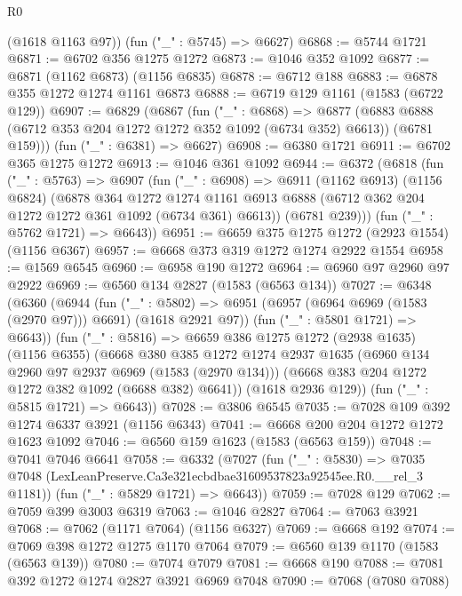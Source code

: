 \begin{lexlean}{R0}
\begin{coremodule}
      (@1618 @1163 @97))
    (fun ("_" : @5745) => @6627)
@6868 := @5744 @1721
@6871 := @6702 @356 @1275 @1272
@6873 := @1046 @352 @1092
@6877 := @6871 (@1162 @6873) (@1156 @6835)
@6878 := @6712 @188
@6883 := @6878 @355 @1272 @1274 @1161 @6873
@6888 := @6719 @129 @1161 (@1583 (@6722 @129))
@6907 := @6829
    (@6867
      (fun ("_" : @6868) =>
      @6877 (@6883 @6888 (@6712 @353 @204 @1272 @1272 @352 @1092 (@6734 @352) @6613)) (@6781 @159)))
    (fun ("_" : @6381) => @6627)
@6908 := @6380 @1721
@6911 := @6702 @365 @1275 @1272
@6913 := @1046 @361 @1092
@6944 := @6372
    (@6818
      (fun ("_" : @5763) =>
      @6907
        (fun ("_" : @6908) =>
        @6911
          (@1162 @6913)
          (@1156 @6824)
          (@6878
            @364
            @1272
            @1274
            @1161
            @6913
            @6888
            (@6712 @362 @204 @1272 @1272 @361 @1092 (@6734 @361) @6613))
          (@6781 @239)))
      (fun ("_" : @5762 @1721) => @6643))
@6951 := @6659 @375 @1275 @1272 (@2923 @1554) (@1156 @6367)
@6957 := @6668 @373 @319 @1272 @1274 @2922 @1554
@6958 := @1569 @6545
@6960 := @6958 @190 @1272
@6964 := @6960 @97 @2960 @97 @2922
@6969 := @6560 @134 @2827 (@1583 (@6563 @134))
@7027 := @6348
    (@6360
      (@6944
        (fun ("_" : @5802) =>
        @6951 (@6957 (@6964 @6969 (@1583 (@2970 @97))) @6691) (@1618 @2921 @97))
        (fun ("_" : @5801 @1721) => @6643))
      (fun ("_" : @5816) =>
      @6659
        @386
        @1275
        @1272
        (@2938 @1635)
        (@1156 @6355)
        (@6668
          @380
          @385
          @1272
          @1274
          @2937
          @1635
          (@6960 @134 @2960 @97 @2937 @6969 (@1583 (@2970 @134)))
          (@6668 @383 @204 @1272 @1272 @382 @1092 (@6688 @382) @6641))
        (@1618 @2936 @129))
      (fun ("_" : @5815 @1721) => @6643))
@7028 := @3806 @6545
@7035 := @7028 @109 @392 @1274 @6337 @3921 (@1156 @6343)
@7041 := @6668 @200 @204 @1272 @1272 @1623 @1092
@7046 := @6560 @159 @1623 (@1583 (@6563 @159))
@7048 := @7041 @7046 @6641
@7058 := @6332
    (@7027
      (fun ("_" : @5830) =>
      @7035 @7048 (LexLeanPreserve.Ca3e321ecbdbae31609537823a92545ee.R0.__rel_3 @1181))
      (fun ("_" : @5829 @1721) => @6643))
@7059 := @7028 @129
@7062 := @7059 @399 @3003 @6319
@7063 := @1046 @2827
@7064 := @7063 @3921
@7068 := @7062 (@1171 @7064) (@1156 @6327)
@7069 := @6668 @192
@7074 := @7069 @398 @1272 @1275 @1170 @7064
@7079 := @6560 @139 @1170 (@1583 (@6563 @139))
@7080 := @7074 @7079
@7081 := @6668 @190
@7088 := @7081 @392 @1272 @1274 @2827 @3921 @6969 @7048
@7090 := @7068 (@7080 @7088)

\end{coremodule}
\end{lexlean}
